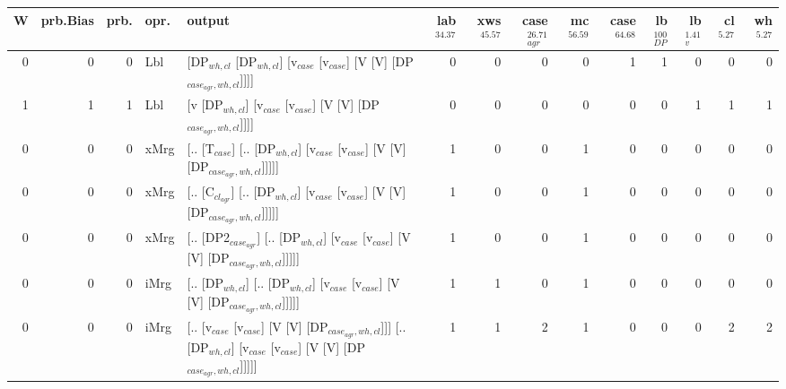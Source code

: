 \begin{tabularx}{\linewidth}{rrrlXrrrrrrrrr}
\hline
   W &   prb.Bias &   prb. & opr.   & output                                                                                                           &   lab$^{34.37}$ &   xws$^{45.57}$ &   case$_{agr}^{26.71}$ &   mc$^{56.59}$ &   case$^{64.68}$ &   lb$_{DP}^{100}$ &   lb$_{v}^{1.41}$ &   cl$^{5.27}$ &   wh$^{5.27}$ \\
\hline
   0 &       0 &   0 & Lbl  & [DP$_{wh,cl}$ [DP$_{wh,cl}$] [v$_{case}$ [v$_{case}$] [V [V] [DP$_{case_{agr},wh,cl}$]]]]                                              &             0 &             0 &                  0 &            0 &              1 &                1 &             0 &        0 &        0 \\
   1 &       1 &   1 & Lbl  & [v [DP$_{wh,cl}$] [v$_{case}$ [v$_{case}$] [V [V] [DP$_{case_{agr},wh,cl}$]]]]                                                     &             0 &             0 &                  0 &            0 &              0 &                0 &             1 &        1 &        1 \\
   0 &       0 &   0 & xMrg & [.. [T$_{case}$] [.. [DP$_{wh,cl}$] [v$_{case}$ [v$_{case}$] [V [V] [DP$_{case_{agr},wh,cl}$]]]]]                                      &             1 &             0 &                  0 &            1 &              0 &                0 &             0 &        0 &        0 \\
   0 &       0 &   0 & xMrg & [.. [C$_{cl_{agr}}$] [.. [DP$_{wh,cl}$] [v$_{case}$ [v$_{case}$] [V [V] [DP$_{case_{agr},wh,cl}$]]]]]                                    &             1 &             0 &                  0 &            1 &              0 &                0 &             0 &        0 &        0 \\
   0 &       0 &   0 & xMrg & [.. [DP2$_{case_{agr}}$] [.. [DP$_{wh,cl}$] [v$_{case}$ [v$_{case}$] [V [V] [DP$_{case_{agr},wh,cl}$]]]]]                                &             1 &             0 &                  0 &            1 &              0 &                0 &             0 &        0 &        0 \\
   0 &       0 &   0 & iMrg & [.. [DP$_{wh,cl}$] [.. [DP$_{wh,cl}$] [v$_{case}$ [v$_{case}$] [V [V] [DP$_{case_{agr},wh,cl}$]]]]]                                    &             1 &             1 &                  0 &            1 &              0 &                0 &             0 &        0 &        0 \\
   0 &       0 &   0 & iMrg & [.. [v$_{case}$ [v$_{case}$] [V [V] [DP$_{case_{agr},wh,cl}$]]] [.. [DP$_{wh,cl}$] [v$_{case}$ [v$_{case}$] [V [V] [DP$_{case_{agr},wh,cl}$]]]]] &             1 &             1 &                  2 &            1 &              0 &                0 &             0 &        2 &        2 \\

\end{tabularx}
